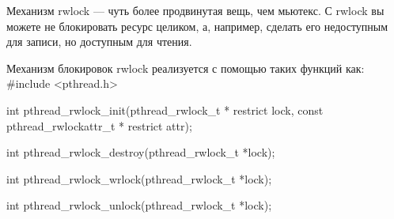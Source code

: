 Механизм rwlock --- чуть более продвинутая вещь, чем мьютекс. С rwlock вы можете не блокировать ресурс целиком, а, например, сделать его недоступным для записи, но доступным для чтения. 

\begin{CCode}{Механизм блокировок rwlock реализуется с помощью таких функций как:}
	#include <pthread.h>

    int pthread_rwlock_init(pthread_rwlock_t * restrict lock,
        const pthread_rwlockattr_t * restrict attr);

    int pthread_rwlock_destroy(pthread_rwlock_t *lock);

	int pthread_rwlock_wrlock(pthread_rwlock_t *lock);

    int pthread_rwlock_unlock(pthread_rwlock_t *lock); \end{CCode}